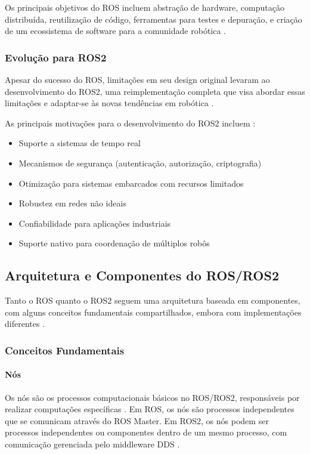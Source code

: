 Os principais objetivos do ROS incluem abstração de hardware, computação distribuída, reutilização de código, ferramentas para testes e depuração, e criação de um ecossistema de software para a comunidade robótica \cite{Quigley2009}.

\subsubsection{Evolução para ROS2}

Apesar do sucesso do ROS, limitações em seu design original levaram ao desenvolvimento do ROS2, uma reimplementação completa que visa abordar essas limitações e adaptar-se às novas tendências em robótica \cite{Macenski2022}.

As principais motivações para o desenvolvimento do ROS2 incluem \cite{Macenski2022, ROS2Design2024}:

\begin{itemize}
    \item Suporte a sistemas de tempo real
    \item Mecanismos de segurança (autenticação, autorização, criptografia)
    \item Otimização para sistemas embarcados com recursos limitados
    \item Robustez em redes não ideais
    \item Confiabilidade para aplicações industriais
    \item Suporte nativo para coordenação de múltiplos robôs
\end{itemize}

\subsection{Arquitetura e Componentes do ROS/ROS2}

Tanto o ROS quanto o ROS2 seguem uma arquitetura baseada em componentes, com alguns conceitos fundamentais compartilhados, embora com implementações diferentes \cite{Quigley2009, Macenski2022}.

\subsubsection{Conceitos Fundamentais}

\paragraph{Nós}

Os nós são os processos computacionais básicos no ROS/ROS2, responsáveis por realizar computações específicas \cite{Quigley2009, Joseph2018}. Em ROS, os nós são processos independentes que se comunicam através do ROS Master. Em ROS2, os nós podem ser processos independentes ou componentes dentro de um mesmo processo, com comunicação gerenciada pelo middleware DDS \cite{Macenski2022}.

